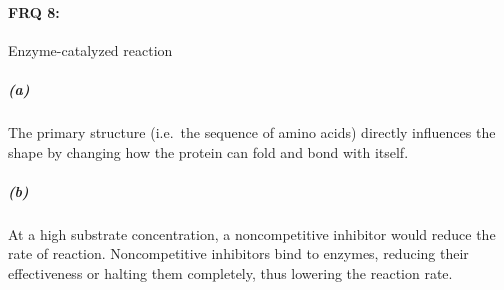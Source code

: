 \documentclass[12pt]{article}
\begin{document}
    \paragraph{FRQ 8:} Enzyme-catalyzed reaction
        \subparagraph*{(a)} The primary structure (i.e.\ the sequence of amino acids) directly influences the shape by changing how the protein can fold and bond with itself.
        \subparagraph*{(b)} At a high substrate concentration, a noncompetitive inhibitor would reduce the rate of reaction. Noncompetitive inhibitors bind to enzymes, reducing their effectiveness or halting them completely, thus lowering the reaction rate.


\thispagestyle{fancy}
\end{document}
